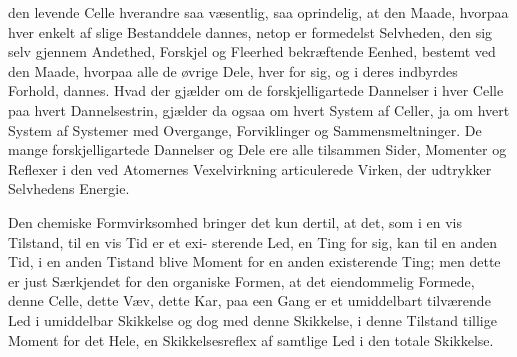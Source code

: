 \documentclass[12pt,a4paper]{book}
\begin{document}
den levende Celle hverandre saa væsentlig, saa oprindelig, at den Maade,
hvorpaa hver enkelt af slige Bestanddele dannes, netop er formedelst
Selvheden, den sig selv gjennem Andethed, Forskjel og Fleerhed
bekræftende Eenhed, bestemt ved den Maade, hvorpaa alle de øvrige Dele,
hver for sig, og i deres indbyrdes Forhold, dannes. Hvad der gjælder om
de forskjelligartede Dannelser i hver Celle paa hvert Dannelsestrin,
gjælder da ogsaa om hvert System af Celler, ja om hvert System af
Systemer med Overgange, Forviklinger og Sammensmeltninger. De mange
forskjelligartede Dannelser og Dele ere alle tilsammen Sider, Momenter
og Reflexer i den ved Atomernes Vexelvirkning articulerede Virken, der
udtrykker Selvhedens Energie.

Den chemiske Formvirksomhed bringer det kun dertil, at det, som i en
vis Tilstand, til en vis Tid er et exi-
sterende Led, en Ting for sig, kan til en anden Tid, i en anden Tistand
blive Moment for en anden existerende Ting; men dette er just
Særkjendet for den organiske Formen, at det eiendommelig Formede, denne
Celle, dette Væv, dette Kar, paa een Gang er et umiddelbart tilværende
Led i umiddelbar Skikkelse og dog med denne Skikkelse, i denne Tilstand
tillige Moment for det Hele, en Skikkelsesreflex af samtlige Led i den
totale Skikkelse.
\end{document}
